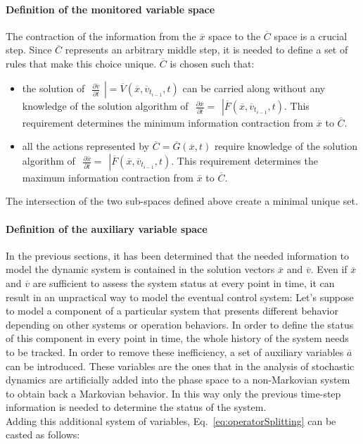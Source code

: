 \paragraph{Definition of the monitored variable space}
The contraction of the information from the $\overline{x}$ space to the $\overline{C}$ space is a crucial step. 
Since $\overline{C}$ represents an arbitrary middle step, it is needed to define a set of rules that make this 
choice unique. $\overline{C}$ is chosen such that:
\begin{itemize}
  \item the solution of  $ \left.\begin{matrix} \frac{\partial \overline{v} }{\partial t} 
  \end{matrix}\right| =\overline{V}\left (  \overline{x},\overline{v}_{t_{i-1}}, t \right )$
  can be carried along without any knowledge of the solution algorithm of
   $ \left.\begin{matrix} 
  \frac{\partial \overline{x} }{\partial t} =  \end{matrix}\right| \overline{F}\left (  
  \overline{x},\overline{v}_{t_{i-1}}, t \right )  
  $. This requirement determines the minimum information contraction from  $\overline{x}$ to  
  $\overline{C}$.
  \item all the actions represented by $\overline{C} = \overline{G}(\overline{x},t)$ require knowledge of the 
  solution algorithm of 
  $ \left.\begin{matrix} 
  \frac{\partial \overline{x} }{\partial t} =  \end{matrix}\right| \overline{F}\left (  
  \overline{x},\overline{v}_{t_{i-1}}, t \right )  $. This requirement determines  the maximum  information contraction from  $\overline{x}$ to  $\overline{C}$.
\end{itemize}
The intersection of the two sub-spaces defined above create a minimal unique set.
\paragraph{Definition of the auxiliary variable space}
In the previous sections, it has been determined that the needed information to model the dynamic system
is contained in the solution vectors $\overline{x}$ and $\overline{v}$. Even if $\overline{x}$ and $\overline{v}$ 
are sufficient to assess the system status at every point in time, it can result in an unpractical way to model
the eventual control system:
Let's suppose to model a component of a particular system that presents different behavior depending on 
other systems or operation behaviors. In order to define the status of this component in every point in time, the 
whole history of the system needs to be tracked. In order to remove these inefficiency, a set of auxiliary variables 
$\overline{a}$ can be introduced. These variables are the ones that in the analysis of stochastic dynamics 
are artificially added into the phase space to a non-Markovian system to obtain back a Markovian behavior. In this
way only the previous time-step information is needed to determine the status of the system. 
\\ Adding this additional system of variables, Eq.~\ref{eq:operatorSplitting} can be casted as follows:


